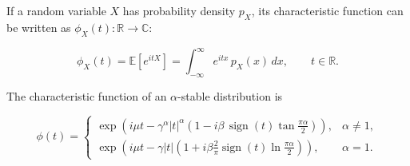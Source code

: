 \documentclass[a4paper, 12pt, openany]{book}
\begin{document}
\begin{tcolorbox}[colback=blue!5!white,colframe=blue!50!black,title=Definition 3: Characteristic function]
\label{def:karakteristicna}
If a random variable $X$ has probability density $p_X$, its characteristic function can be written as
$\phi_X(t): \mathbb{R} \rightarrow \mathbb{C}$:

\[
\phi_X(t)=\mathbb{E}\!\left[e^{itX}\right]
=\int_{-\infty}^{\infty} e^{itx}\,p_X(x)\,dx,
\qquad t\in\mathbb{R}.
\]
\end{tcolorbox}

The characteristic function of an $\alpha$-stable distribution is
\begin{tcolorbox}[colback=blue!5!white,colframe=blue!50!black,title=Definition 4: Characteristic function of an $\alpha$-stable distribution]
\[
\phi(t)=
\begin{cases}
\exp\!\left(
i\mu t
-\gamma^{\alpha}|t|^{\alpha}
\left(
1-i\beta\,\operatorname{sign}(t)\tan\frac{\pi\alpha}{2}
\right)
\right),
& \alpha \neq 1, \\[1.2em]
\exp\!\left(
i\mu t
-\gamma|t|
\left(
1+i\beta\frac{2}{\pi}\operatorname{sign}(t)\ln\frac{\pi\alpha}{2}
\right)
\right),
& \alpha = 1.
\end{cases}
\]
\label{def:karakteristicnaAlpha}
\end{tcolorbox}
\end{document}

